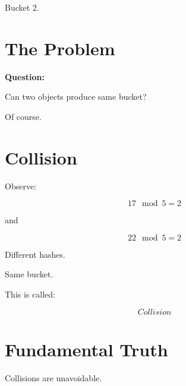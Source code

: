 \documentclass[11pt,a4paper]{book}
\begin{document}

Bucket 2.


\section{The Problem}

\textbf{Question:}

Can two objects produce
same bucket?


Of course.


\section{Collision}

Observe:

\[
17 \mod 5
=
2
\]


and


\[
22 \mod 5
=
2
\]


Different hashes.


Same bucket.


This is called:

\[
Collision
\]


\section{Fundamental Truth}

\begin{rosettarule}

Collisions are unavoidable.

\end{rosettarule}
\end{document}
